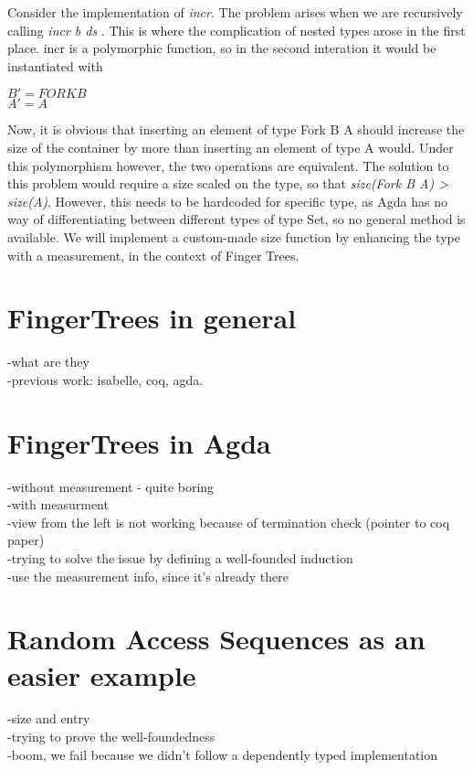 \documentclass[12pt,twoside,notitlepage]{report}
\begin{document}
Consider the implementation of \textit{incr}. The problem arises when we are recursively calling \textit{incr b ds} . This is where the complication of nested types arose in the first place. incr is a polymorphic function, so in the second interation it would be instantiated with 
\begin{center}
$ B' = FORK B$ \\
$ A' = A $ \\
\end{center}
Now, it is obvious that inserting an element of type Fork B A should increase the size of the container by more than inserting an element of type A would. Under this polymorphism however, the two operations are equivalent.
The solution to this problem would require a size scaled on the type, so that\textit{ size(Fork B A) > size(A)}. However, this needs to be hardcoded for specific type, as Agda has no way of differentiating between different types of type Set, so no general method is available.
We will implement a custom-made size function by enhancing the type with a measurement, in the context of Finger Trees.


\section{FingerTrees in general}

-what are they \\
-previous work: isabelle, coq, agda. \\

\section{FingerTrees in Agda}

-without measurement - quite boring \\
-with measurment \\
-view from the left is not working because of termination check (pointer to coq paper) \\
-trying to solve the issue by defining a well-founded induction \\
-use the measurement info, since it's already there \\

\section{Random Access Sequences as an easier example}

-size and entry \\
-trying to prove the well-foundedness \\
-boom, we fail because we didn't follow a dependently typed implementation \\
\end{document}
